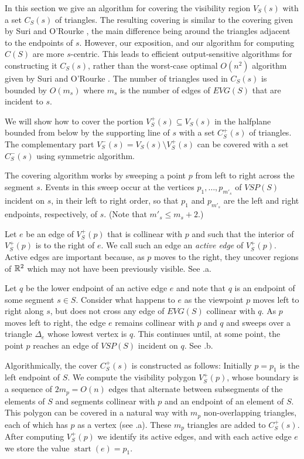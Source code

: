 \documentclass{patmorin}
\newcommand{\EVG}{\mathit{EVG}}
\newcommand{\VSP}{\mathit{VSP}}
\DeclareMathOperator{\start}{start}
\begin{document}
In this section we give an algorithm for covering the visibility region
$V_S(s)$ with a set $C_S(s)$ of triangles.  The resulting covering is
similar to the covering given by Suri and O'Rourke \cite{so84}, the main
difference being around the triangles adjacent to the endpoints of $s$.
However, our exposition, and our algorithm for computing $C(S)$ are more
$s$-centric.  This leads to efficient output-sensitive algorithms for
constructing it $C_S(s)$, rather than the worst-case optimal $O(n^2)$
algorithm given by Suri and O'Rourke \cite{so84}.
The number of triangles used in $C_S(s)$ is bounded by $O(m_s)$ where
$m_s$ is the number of edges of $\EVG(S)$ that are incident to $s$.

We will show how to cover the portion $V^+_S(s)\subseteq V_S(s)$ in the
halfplane bounded from below by the supporting line of $s$ with a set
$C^+_S(s)$ of triangles.  The complementary part $V^-_S(s)=V_S(s)\setminus
V^+_S(s)$ can be covered with a set $C^-_S(s)$ using symmetric algorithm.

The covering algorithm works by sweeping a point $p$ from left to right
across the segment $s$.  Events in this sweep occur at the vertices
$p_1,\ldots,p_{m'_s}$ of $\VSP(S)$ incident on $s$, in their left to right
order, so that $p_1$ and $p_{m'_s}$ are the left and right endpoints,
respectively, of $s$.  (Note that $m'_s \le m_s + 2$.)

Let $e$ be an edge of $V^+_S(p)$ that is collinear with $p$ and such that the
interior of $V^+_S(p)$ is to the right of $e$. We call such an edge an
\emph{active edge} of $V^+_S(p)$.  Active edges are important because, as $p$
moves to the right, they uncover regions of $\mathbb{R}^2$ which may not have been
previously visible.  See .a.

Let $q$ be the lower endpoint of an active edge $e$ and note that $q$
is an endpoint of some segment $s\in S$. Consider what happens to $e$
as the viewpoint $p$ moves left to right along $s$, but does not cross
any edge of $\EVG(S)$ collinear with $q$.  As $p$ moves left to right,
the edge $e$ remains collinear with $p$ and $q$ and sweeps over a
triangle $\Delta_e$ whose lowest vertex is $q$.  This continues until,
at some point, the point $p$ reaches an edge of $\VSP(S)$ incident on $q$.
See .b.

Algorithmically, the cover $C^+_S(s)$ is constructed as follows: Initially
$p=p_1$ is the left endpoint of $S$.  We compute the visibility polygon
$V^+_S(p)$, whose boundary is a sequence of $2m_p=O(n)$ edges that alternate
between subsegments of the elements of $S$ and segments collinear with $p$
and an endpoint of an element of $S$.  This polygon can be covered in a
natural way with $m_p$ non-overlapping triangles, each of which has $p$
as a vertex (see .a). These $m_p$ triangles are added to
$C^+_S(s)$.  After computing $V^+_S(p)$ we identify its active edges, and with
each active edge $e$ we store the value $\start(e)=p_1$.
\end{document}
